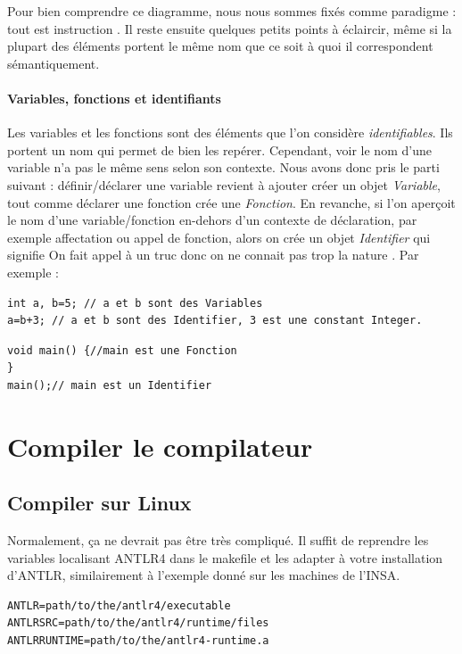 \documentclass{report}
\begin{document}
Pour bien comprendre ce diagramme, nous nous sommes fixés comme paradigme : \og tout est instruction \fg . Il reste ensuite quelques petits points à éclaircir, même si la plupart des éléments portent le même nom que ce soit à quoi il correspondent sémantiquement.\\
\paragraph{Variables, fonctions et identifiants} Les variables et les fonctions sont des éléments que l'on considère \emph{identifiables}. Ils portent un nom qui permet de bien les repérer. Cependant, voir le nom d'une variable n'a pas le même sens selon son contexte. Nous avons donc pris le parti suivant : définir/déclarer une variable revient à ajouter créer un objet \emph{Variable}, tout comme déclarer une fonction crée une \emph{Fonction}. En revanche, si l'on aperçoit le nom d'une variable/fonction en-dehors d'un contexte de déclaration, par exemple affectation ou appel de fonction, alors on crée un objet \emph{Identifier} qui signifie \og On fait appel à un truc donc on ne connait pas trop la nature \fg . Par exemple :\\

\begin{lstlisting}
int a, b=5; // a et b sont des Variables
a=b+3; // a et b sont des Identifier, 3 est une constant Integer.
\end{lstlisting}
\begin{lstlisting}
void main() {//main est une Fonction
}
main();// main est un Identifier
\end{lstlisting}
\section{Compiler le compilateur}
\label{sec:Compile}

\subsection{Compiler sur Linux}
\label{subsec:Linux}
Normalement, ça ne devrait pas être très compliqué. Il suffit de reprendre les variables localisant ANTLR4 dans le makefile et les adapter à votre installation d'ANTLR, similairement à l'exemple donné sur les machines de l'INSA.

\lstset{style=make}
\begin{lstlisting}
ANTLR=path/to/the/antlr4/executable
ANTLRSRC=path/to/the/antlr4/runtime/files
ANTLRRUNTIME=path/to/the/antlr4-runtime.a
\end{lstlisting}
\end{document}
